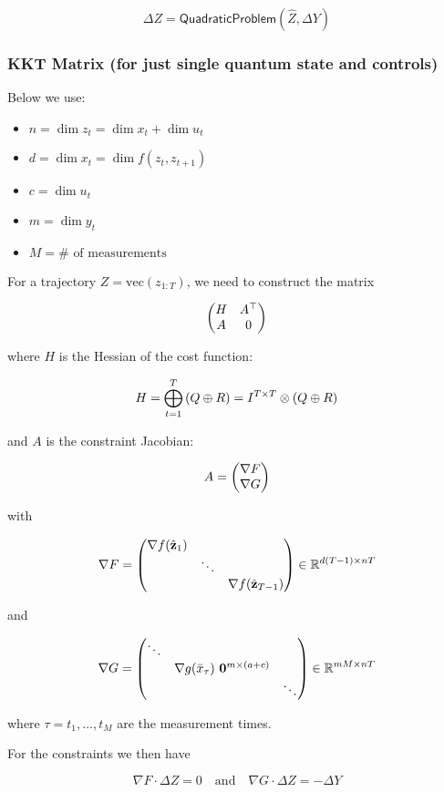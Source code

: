 \documentclass{article}
\begin{document}
$$
\boxed{
\Delta Z = \textsf{QuadraticProblem}(\hat Z, \Delta Y)
}
$$

\newpage
\subsubsection*{KKT Matrix (for just single quantum state and controls)}

Below we use:

\begin{itemize}
  \item $n = \dim z_t = \dim x_t + \dim u_t $ 
  \item $d = \dim x_t = \dim f(z_t, z_{t+1}) $ 
  \item $c = \dim u_t$  
  \item $m = \dim y_t$ 
  \item $M = \#\text{ of measurements}$
\end{itemize}



For a trajectory $Z = \text{vec}(z_{1:T})$, we need to construct the matrix

$$
\mqty(
  H & A^\top \\
  A & 0
)
$$


where $H$ is the Hessian of the cost function:

$$
H = \bigoplus_{t=1}^T \qty(Q \oplus R) = I^{T \times T} \otimes \qty(Q \oplus R)
$$


and $A$ is the constraint Jacobian:

$$
A = \mqty(
  \nabla F \\
  \nabla G
)
$$

with 

$$
\nabla F = \mqty(
  \nabla f(\hat{\vb{z}}_1) \\
  & \ddots \\
  & & \nabla f(\hat{\vb{z}}_{T-1})
) \in \mathbb{R}^{d (T - 1) \times n T}
$$

and

$$
\nabla G = \mqty(
  \ddots \\
  & \nabla g(\bar x_{\tau}) \ \vb{0}^{m \times (a + c)} \\
  & & \ddots
) \in \mathbb{R}^{m M \times n T}
$$

where $\tau = t_1, \dots, t_M$ are the measurement times.

\hfill

For the constraints we then have

$$
\nabla F \cdot \Delta Z = 0
\quad \text{and} \quad
\nabla G \cdot \Delta Z = - \Delta Y
$$
\end{document}
